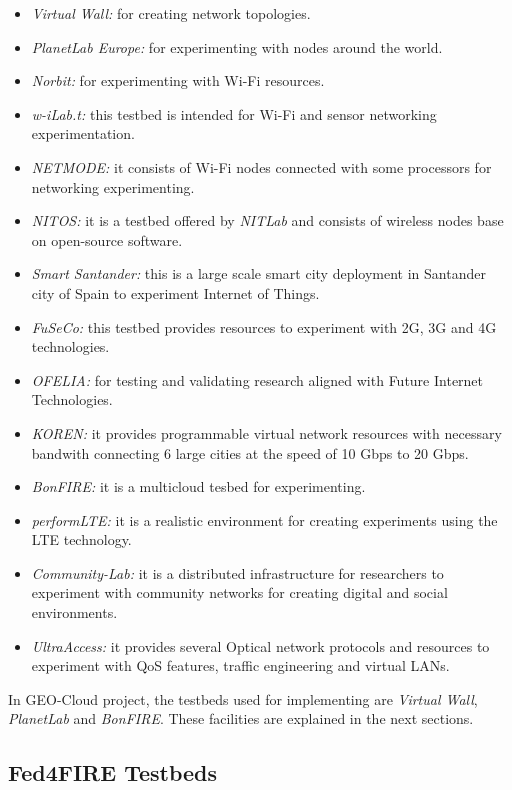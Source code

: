 \begin{itemize}
\begin{itemize}
\item \emph{Virtual Wall:} for creating network topologies.
\item \emph{PlanetLab Europe:} for experimenting with nodes around the world.
\item \emph{Norbit:} for experimenting with Wi-Fi resources.
\item \emph{w-iLab.t:} this testbed is intended for Wi-Fi and sensor networking experimentation.
\item \emph{NETMODE:} it consists of Wi-Fi nodes connected with some processors
  for networking experimenting.
\item \emph{NITOS:} it is a testbed offered by \emph{NITLab} and consists of wireless
  nodes base on open-source software.
\item \emph{Smart Santander:} this is a large scale smart city deployment in
  Santander city of Spain to experiment Internet of Things.
\item \emph{FuSeCo:} this testbed provides resources to experiment with 2G, 3G
  and 4G technologies.
\item \emph{OFELIA:} for testing and validating research aligned
  with Future Internet Technologies.
\item \emph{KOREN:} it provides programmable virtual network resources with
  necessary bandwith connecting 6 large cities at the speed of 10 Gbps to 20 Gbps.
\item \emph{BonFIRE:} it is a multicloud tesbed for experimenting.
\item \emph{performLTE:} it is a realistic environment for creating experiments
  using the \ac{LTE} technology.
\item \emph{Community-Lab:} it is a distributed infrastructure for researchers
  to experiment with community networks for creating digital and social environments.
\item \emph{UltraAccess:} it provides several Optical network protocols and
  resources to experiment with \ac{QoS} features, traffic engineering and virtual \acp{LAN}.
\end{itemize}
\end{itemize}


In GEO-Cloud project, the testbeds used for implementing are \emph{Virtual
  Wall}, \emph{PlanetLab} and \emph{BonFIRE}. These facilities are explained in the next sections.

\subsection{Fed4FIRE Testbeds}

